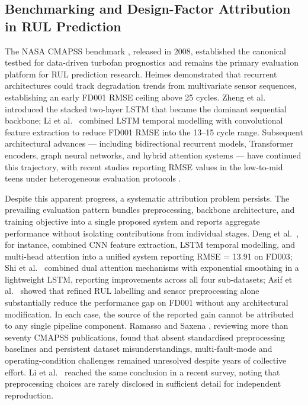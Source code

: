 \documentclass[preprint,10pt]{elsarticle}
\begin{document}
\subsection{Benchmarking and Design-Factor Attribution in RUL Prediction}

The NASA CMAPSS benchmark \cite{ref01}, released in 2008, established the canonical testbed for data-driven turbofan prognostics and remains the primary evaluation platform for RUL prediction research. Heimes \cite{ref02} demonstrated that recurrent architectures could track degradation trends from multivariate sensor sequences, establishing an early FD001 RMSE ceiling above 25 cycles. Zheng et al.\ \cite{ref05} introduced the stacked two-layer LSTM that became the dominant sequential backbone; Li et al.\ \cite{ref06} combined LSTM temporal modelling with convolutional feature extraction to reduce FD001 RMSE into the 13--15 cycle range. Subsequent architectural advances --- including bidirectional recurrent models, Transformer encoders, graph neural networks, and hybrid attention systems --- have continued this trajectory, with recent studies reporting RMSE values in the low-to-mid teens under heterogeneous evaluation protocols \cite{ref13,ref15,ref29}.

Despite this apparent progress, a systematic attribution problem persists. The prevailing evaluation pattern bundles preprocessing, backbone architecture, and training objective into a single proposed system and reports aggregate performance without isolating contributions from individual stages. Deng et al.\ \cite{ref29}, for instance, combined CNN feature extraction, LSTM temporal modelling, and multi-head attention into a unified system reporting RMSE = 13.91 on FD003; Shi et al.\ \cite{ref50} combined dual attention mechanisms with exponential smoothing in a lightweight LSTM, reporting improvements across all four sub-datasets; Asif et al.\ \cite{ref42} showed that refined RUL labelling and sensor preprocessing alone substantially reduce the performance gap on FD001 without any architectural modification. In each case, the source of the reported gain cannot be attributed to any single pipeline component. Ramasso and Saxena \cite{ref03}, reviewing more than seventy CMAPSS publications, found that absent standardised preprocessing baselines and persistent dataset misunderstandings, multi-fault-mode and operating-condition challenges remained unresolved despite years of collective effort. Li et al.\ \cite{ref17} reached the same conclusion in a recent survey, noting that preprocessing choices are rarely disclosed in sufficient detail for independent reproduction.
\end{document}
